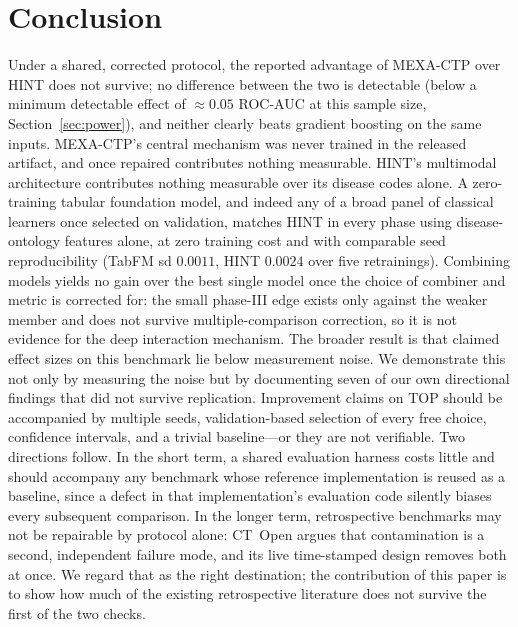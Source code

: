 \documentclass[a4paper,fleqn]{cas-sc}
\begin{document}
\section{Conclusion}
Under a shared, corrected protocol, the reported advantage of MEXA-CTP over HINT does not
survive; no difference between the two is detectable (below a minimum detectable effect of
$\approx0.05$ ROC-AUC at this sample size, Section~\ref{sec:power}), and neither clearly beats gradient boosting on the
same inputs. MEXA-CTP's central mechanism was never trained in the released artifact, and
once repaired contributes nothing measurable. HINT's multimodal architecture contributes
nothing measurable over its disease codes alone. A zero-training tabular foundation model,
and indeed any of a broad panel of classical learners once selected on validation, matches
HINT in every phase using disease-ontology features alone, at zero training cost and with
comparable seed reproducibility (TabFM sd $0.0011$, HINT $0.0024$ over five retrainings).
Combining models yields no gain over the best single model
once the choice of combiner and metric is corrected for: the small phase-III edge exists only
against the weaker member and does not survive multiple-comparison correction, so it is not
evidence for the deep interaction mechanism.
The broader result is that claimed effect sizes on this benchmark lie below measurement
noise. We demonstrate this not only by measuring the noise but by documenting seven of our own directional findings that did not survive replication. Improvement claims on TOP should be accompanied by multiple seeds, validation-based selection of every free choice, confidence intervals, and a trivial baseline---or they are not verifiable.
Two directions follow. In the short term, a shared evaluation harness costs little and should accompany any benchmark whose reference implementation is reused as a baseline, since a defect in that implementation's evaluation code silently biases every subsequent comparison. In the longer term, retrospective benchmarks may not be repairable by protocol alone: CT~Open \citep{wang2025ctopen} argues that contamination is a second, independent failure mode, and its live time-stamped design removes both at once. We regard that as the right destination; the contribution of this paper is to show how much of the existing retrospective literature does not survive the first of the two checks.
\end{document}
